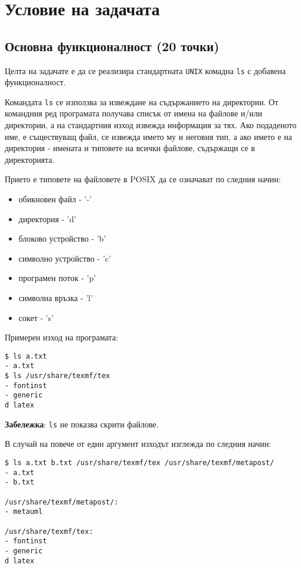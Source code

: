 \documentclass[a4paper,10pt]{article}
\begin{document}


\section{Условие на задачата}
\subsection{Основна функционалност (20 точки)}

Целта на задачате е да се реализира стандартната \lstinline{UNIX} комадна \lstinline{ls} с добавена функционалност.

Командата \lstinline{ls} се използва за извеждане на съдържанието на директории. От командния ред програмата получава списък от имена на файлове и/или директории, а на стандартния изход извежда информация за тях. Ако подаденото име, е съществуващ файл, се извежда името му и неговия тип, а ако името е на директория - имената и типовете на всички файлове, съдържащи се в директорията.

Прието е типовете на файловете в POSIX да се означават по следния начин:
\begin{itemize}
	\item обикновен файл - '-'
	\item директория - 'd'
	\item блоково устройство - 'b'
	\item символно устройство - 'c'
	\item програмен поток - 'p'
	\item символна връзка - 'l'
	\item сокет - 's'
\end{itemize}

Примерен изход на програмата:
\begin{verbatim}
$ ls a.txt 
- a.txt
$ ls /usr/share/texmf/tex 
- fontinst  
- generic  
d latex
\end{verbatim}

\textbf{Забележка}: \lstinline{ls} не показва скрити файлове.\newline

В случай на повече от един аргумент изходът изглежда по следния начин:
\begin{verbatim}
$ ls a.txt b.txt /usr/share/texmf/tex /usr/share/texmf/metapost/
- a.txt
- b.txt

/usr/share/texmf/metapost/:
- metauml

/usr/share/texmf/tex:
- fontinst
- generic
d latex
\end{verbatim}
\end{document}
